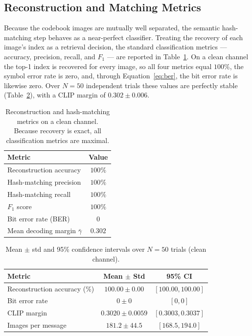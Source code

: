 \documentclass[11pt]{article}
\begin{document}
\subsection{Reconstruction and Matching Metrics}\label{sec:metrics}
Because the codebook images are mutually well separated, the semantic
hash-matching step behaves as a near-perfect classifier. Treating the recovery of
each image's index as a retrieval decision, the standard classification metrics
--- accuracy, precision, recall, and $F_1$ --- are reported in
Table~\ref{tab:prf1}. On a clean channel the top-1 index is recovered for every
image, so all four metrics equal $100\%$, the symbol error rate is zero, and,
through Equation~\eqref{eq:ber}, the bit error rate is likewise zero. Over $N{=}50$
independent trials these values are perfectly stable (Table~\ref{tab:stats}), with a
CLIP margin of $0.302\pm0.006$.

\begin{table}[H]
\centering
\caption{Reconstruction and hash-matching metrics on a clean channel. Because recovery is exact, all classification metrics are maximal.}\label{tab:prf1}
\begin{tabular}{@{}lc@{}}
\toprule
Metric & Value \\
\midrule
Reconstruction accuracy & $100\%$ \\
Hash-matching precision  & $100\%$ \\
Hash-matching recall     & $100\%$ \\
$F_1$ score              & $100\%$ \\
Bit error rate (BER)     & $0$ \\
Mean decoding margin $\bar\gamma$ & $0.302$ \\
\bottomrule
\end{tabular}
\end{table}

\begin{table}[H]
\centering
\caption{Mean $\pm$ std and 95\% confidence intervals over $N{=}50$ trials (clean channel).}\label{tab:stats}
\begin{tabular}{@{}lcc@{}}
\toprule
Metric & Mean $\pm$ Std & 95\% CI \\
\midrule
Reconstruction accuracy (\%) & $100.00\pm0.00$ & $[100.00,100.00]$ \\
Bit error rate               & $0\pm0$         & $[0,0]$ \\
CLIP margin                  & $0.3020\pm0.0059$ & $[0.3003,0.3037]$ \\
Images per message           & $181.2\pm44.5$  & $[168.5,194.0]$ \\
\bottomrule
\end{tabular}
\end{table}
\end{document}
